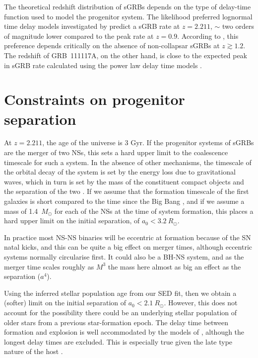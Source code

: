 \documentclass{aa}    %
\begin{document}
The theoretical redshift distribution of sGRBs depends on the type of delay-time
function used to model the progenitor system. The likelihood preferred lognormal
time delay models investigated by \citet{Wanderman2015} predict a sGRB rate at
$z = 2.211$, $\sim$ two orders of magnitude lower compared to the peak rate at
$z = 0.9$. According to \citet{Wanderman2015}, this preference depends
critically on the absence of non-collapsar sGRBs at $z \gtrsim 1.2$. The
redshift of GRB~111117A, on the other hand, is close to the expected peak in
sGRB rate calculated using the power law delay time models \citep{Behroozi2014,
	Wanderman2015}.


\section{Constraints on progenitor separation}

At $z = 2.211$, the age of the universe is 3 Gyr. If the progenitor systems of
sGRBs are the merger of two NSs, this sets a hard upper limit to the coalescence
timescale for such a system. In the absence of other mechanisms, the timescale
of the orbital decay of the system is set by the energy loss due to
gravitational waves, which in turn is set by the mass of the constituent compact
objects and the separation of the two \citep{Postnov2014}. If we assume that the
formation timescale of the first galaxies is short compared to the time since
the Big Bang \citep{Richard2011}, and if we assume a mass of 1.4~$M_\odot$ for
each of the NSs at the time of system formation, this places a hard upper limit
on the initial separation, of $a_0 < 3.2~R_\odot$.

In practice most NS-NS binaries will be eccentric at formation because of the SN
natal kicks, and this can be quite a big effect on merger times, although
eccentric systems normally circularise first. It could also be a BH-NS system,
and as the merger time scales roughly as $M^3$ the mass here almost as big an
effect as the separation ($a^4$).

Using the inferred stellar population age from our SED fit, then we obtain a
(softer) limit on the initial separation of $a_0 < 2.1~R_\odot$. However, this
does not account for the possibility there could be an underlying stellar
population of older stars from a previous star-formation epoch. The delay time
between formation and explosion is well accommodated by the models of
\citet{Belczynski2006}, although the longest delay times are excluded.
This is especially true given the late type nature of the host
\citep{OShaughnessy2008}.
\end{document}
